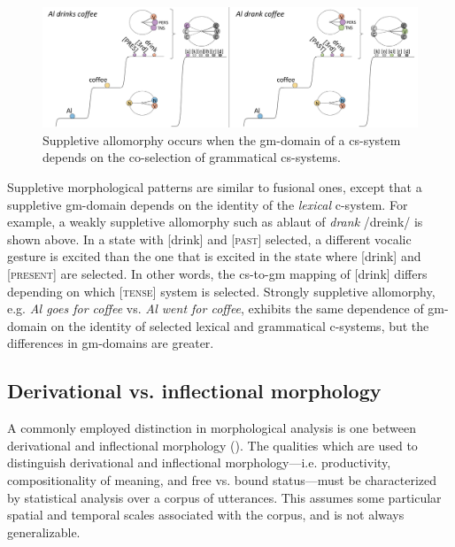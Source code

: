   
\begin{figure}
\includegraphics[width=\textwidth]{figures/Tilsen-img69.png}
\caption{Suppletive allomorphy occurs when the gm-domain of a cs-system depends on the co-selection of grammatical cs-systems.}
\label{fig:4:19}
\end{figure}
 

  Suppletive morphological patterns are similar to fusional ones, except that a suppletive gm-domain depends on the identity of the \textit{lexical} c-system. For example, a weakly suppletive allomorphy such as ablaut of \textit{drank} /dreink/ is shown above. In a state with [drink] and [\textsc{past}] selected, a different vocalic gesture is excited than the one that is excited in the state where [drink] and [\textsc{present}] are selected. In other words, the cs-to-gm mapping of [drink] differs depending on which [\textsc{tense}] system is selected. Strongly suppletive allomorphy, e.g. \textit{Al goes for coffee} vs. \textit{Al went for coffee}, exhibits the same dependence of gm-domain on the identity of selected lexical and grammatical c-systems, but the differences in gm-domains are greater.

\subsection{Derivational vs. inflectional morphology}

A commonly employed distinction in morphological analysis is one between derivational and inflectional morphology (\citealt{BickelNichols2007,Booij1996,Dressler1989,HaspelmathSims2013}). The qualities which are used to distinguish derivational and inflectional morphology—i.e. productivity, compositionality of meaning, and free vs. bound status—must be characterized by statistical analysis over a corpus of utterances. This assumes some particular spatial and temporal scales associated with the corpus, and is not always generalizable. 

